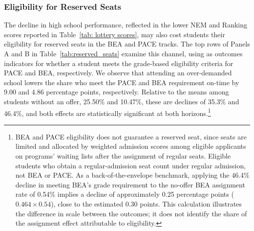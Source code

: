 \subsubsection{Eligibility for Reserved Seats}\label{sec:reserved-seats}
The decline in high school performance, reflected in the lower NEM and Ranking scores reported in Table~\ref{tab: lottery scores}, may also cost students their eligibility for reserved seats in the BEA and PACE tracks. The top rows of Panels A and B in Table~\ref{tab:reserved_seats} examine this channel, using as outcomes indicators for whether a student meets the grade-based eligibility criteria for PACE and BEA, respectively. 
We observe that attending an over-demanded school lowers the share who meet the PACE and BEA requirement on-time by 9.00 and 4.86 percentage points, respectively. Relative to the means among students without an offer, 25.50\% and 10.47\%, these are declines of 35.3\% and 46.4\%, and both effects are statistically significant at both horizons.\footnote{BEA and PACE eligibility does not guarantee a reserved seat, since seats are limited and allocated by weighted admission scores among eligible applicants on programs' waiting lists after the assignment of regular seats. Eligible students who obtain a regular-admission seat count under regular admission, not BEA or PACE. As a back-of-the-envelope benchmark, applying the 46.4\% decline in meeting BEA's grade requirement to the no-offer BEA assignment rate of 0.54\% implies a decline of approximately 0.25 percentage points ($0.464 \times 0.54$), close to the estimated 0.30 points. This calculation illustrates the difference in scale between the outcomes; it does not identify the share of the assignment effect attributable to eligibility.}



